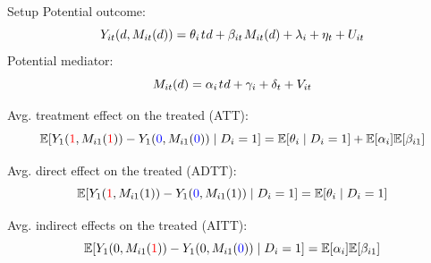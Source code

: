 \documentclass[aspectratio=1610, 9pt]{beamer}
\begin{document}
\begin{frame}{Setup}
Potential outcome:
         $$Y_{it}(d,M_{it}(d))=\theta_i \hspace{0.1em} t \hspace{0.05em} d   + \beta_{it}\hspace{0.1em} M_{it}(d)+\lambda_i+\eta_t + U_{it}$$
Potential mediator:
        $$M_{it}(d)=\alpha_i \hspace{0.1em} t\hspace{0.05em} d  + \gamma_i +\delta_t +V _{it}$$

Avg. treatment effect on the treated (ATT): $$\mathbb{E}[Y_1(\textcolor{red}{1},M_{i1}(\textcolor{red}{1}))-Y_1(\textcolor{blue}{0},M_{i1}(\textcolor{blue}{0}))\mid D_i=1]=\mathbb{E}[\theta_i\mid D_i=1] +\mathbb{E}[\alpha_i]\mathbb{E}[\beta_{i1}]$$

Avg. direct effect on the treated (ADTT):
$$\mathbb{E}[Y_1(\textcolor{red}{1},M_{i1}(1))-Y_1(\textcolor{blue}{0},M_{i1}(1))\mid D_i=1]=\mathbb{E}[\theta_i \mid D_i=1]$$

Avg. indirect effects on the treated (AITT): 
$$\mathbb{E}[Y_1(0,M_{i1}(\textcolor{red}{1}))-Y_1(0,M_{i1}(\textcolor{blue}{0}))\mid D_i=1]=\mathbb{E}[\alpha_i]\mathbb{E}[\beta_{i1}]$$

\end{frame}
\end{document}

